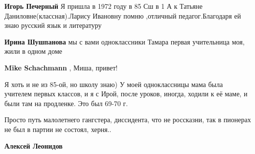\begin{itemize}
\begin{itemize}
\begin{itemize}
\textbf{Игорь Печерный} Я пришла в 1972 году в 85 Сш в 1 А к Татьяне
Даниловне(классная).Ларису Ивановну помню ,отличный педагог.Благодаря ей знаю
русский язык и литературу


 
\textbf{Ирина Шушпанова} мы с вами одноклассники Тамара первая учительница моя, жили в одном доме


 

\textbf{Mike Schachmann} , Миша, привет!
\end{itemize}

 

Я хоть и не из 85-ой, но школу знаю) У моей одноклассницы мама была учителем
первых классов, и я с Ирой, после уроков, иногда, ходили к её маме, и были там
на продленке. Это был 69-70 г.

\end{itemize}

 
Просто путь малолетнего гангстера, диссидента, что не россказни, так в пионерах
не был в партии не состоял, херня..

\begin{itemize}
 

\textbf{Алексей Леонидов} 


\end{itemize}
\end{itemize}
